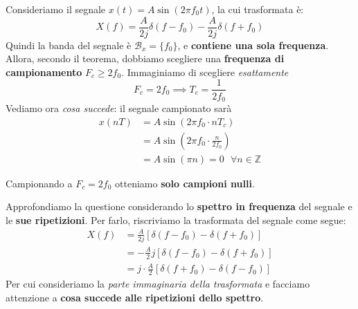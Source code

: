 Consideriamo il segnale $x(t)= A\sin(2\pi f_{0}t)$, la cui trasformata è:
\[
    X(f) = \frac{A}{2j}\delta(f-f_{0}) - \frac{A}{2j}\delta(f+f_{0})
\]
Quindi la banda del segnale è $\mathcal{B}_x = \{f_{0}\}$, e \textbf{contiene una sola frequenza}.
Allora, secondo il teorema, dobbiamo scegliere una \textbf{frequenza di campionamento}
$F_c \ge 2f_{0}$.
Immaginiamo di scegliere \textit{esattamente}
\[
    F_c = 2f_{0} \implies T_c = \frac{1}{2f_{0}}
\]
Vediamo ora \textit{cosa succede}: il segnale campionato sarà
\[
    \begin{aligned}
        x(nT) &= A \sin (2\pi f_{0} \cdot nT_c) \\ 
              &= A \sin \left( 2\pi f_{0} \cdot \frac{n}{2f_{0}} \right) \\ 
              &= A \sin (\pi n) = 0 \text{ } \forall n\in \mathbb{Z}
    \end{aligned}
\]

\begin{remark}
    Campionando a $F_c = 2f_{0}$ otteniamo \textbf{solo campioni nulli}.
\end{remark}

Approfondiamo la questione considerando lo \textbf{spettro in frequenza} 
del segnale e le \textbf{sue ripetizioni}. Per farlo, riscriviamo 
la trasformata del segnale come segue:
\[
    \begin{aligned}
        X(f) &= \frac{A}{2j} [ \delta(f-f_{0}) - \delta(f+f_{0}) ] \\ 
             &= -\frac{A}{2}j [ \delta(f-f_{0}) - \delta(f+f_{0}) ] \\ 
             &= j\cdot \frac{A}{2}[\delta(f+f_{0}) - \delta(f-f_{0})]
    \end{aligned}
\]
Per cui consideriamo la \textit{parte immaginaria della trasformata} e facciamo
attenzione a \textbf{cosa succede alle ripetizioni dello spettro}.

